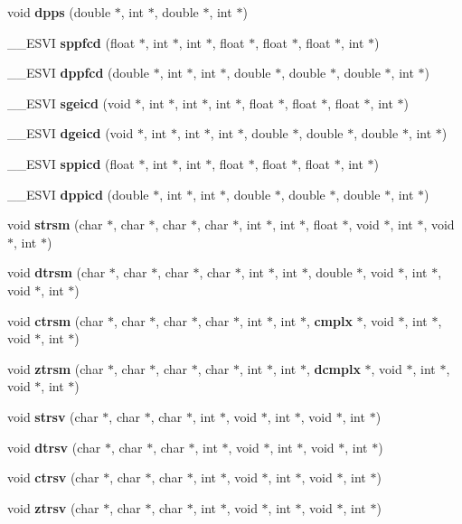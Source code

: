 \begin{CompactItemize}
\item 
void {\bf dpps} (double $\ast$, int $\ast$, double $\ast$, int $\ast$)
\item 
\_\-\_\-ESVI {\bf sppfcd} (float $\ast$, int $\ast$, int $\ast$, float $\ast$, float $\ast$, float $\ast$, int $\ast$)
\item 
\_\-\_\-ESVI {\bf dppfcd} (double $\ast$, int $\ast$, int $\ast$, double $\ast$, double $\ast$, double $\ast$, int $\ast$)
\item 
\_\-\_\-ESVI {\bf sgeicd} (void $\ast$, int $\ast$, int $\ast$, int $\ast$, float $\ast$, float $\ast$, float $\ast$, int $\ast$)
\item 
\_\-\_\-ESVI {\bf dgeicd} (void $\ast$, int $\ast$, int $\ast$, int $\ast$, double $\ast$, double $\ast$, double $\ast$, int $\ast$)
\item 
\_\-\_\-ESVI {\bf sppicd} (float $\ast$, int $\ast$, int $\ast$, float $\ast$, float $\ast$, float $\ast$, int $\ast$)
\item 
\_\-\_\-ESVI {\bf dppicd} (double $\ast$, int $\ast$, int $\ast$, double $\ast$, double $\ast$, double $\ast$, int $\ast$)
\item 
void {\bf strsm} (char $\ast$, char $\ast$, char $\ast$, char $\ast$, int $\ast$, int $\ast$, float $\ast$, void $\ast$, int $\ast$, void $\ast$, int $\ast$)
\item 
void {\bf dtrsm} (char $\ast$, char $\ast$, char $\ast$, char $\ast$, int $\ast$, int $\ast$, double $\ast$, void $\ast$, int $\ast$, void $\ast$, int $\ast$)
\item 
void {\bf ctrsm} (char $\ast$, char $\ast$, char $\ast$, char $\ast$, int $\ast$, int $\ast$, {\bf cmplx} $\ast$, void $\ast$, int $\ast$, void $\ast$, int $\ast$)
\item 
void {\bf ztrsm} (char $\ast$, char $\ast$, char $\ast$, char $\ast$, int $\ast$, int $\ast$, {\bf dcmplx} $\ast$, void $\ast$, int $\ast$, void $\ast$, int $\ast$)
\item 
void {\bf strsv} (char $\ast$, char $\ast$, char $\ast$, int $\ast$, void $\ast$, int $\ast$, void $\ast$, int $\ast$)
\item 
void {\bf dtrsv} (char $\ast$, char $\ast$, char $\ast$, int $\ast$, void $\ast$, int $\ast$, void $\ast$, int $\ast$)
\item 
void {\bf ctrsv} (char $\ast$, char $\ast$, char $\ast$, int $\ast$, void $\ast$, int $\ast$, void $\ast$, int $\ast$)
\item 
void {\bf ztrsv} (char $\ast$, char $\ast$, char $\ast$, int $\ast$, void $\ast$, int $\ast$, void $\ast$, int $\ast$)

\end{CompactItemize}
